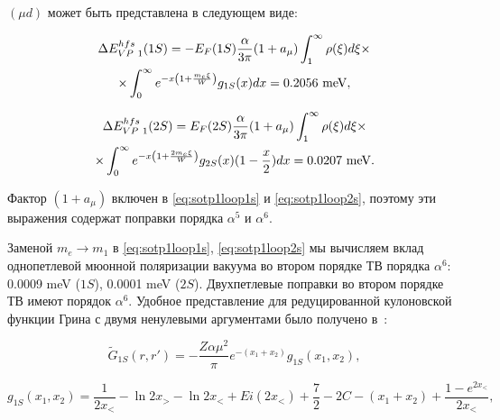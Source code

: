 $(\mu d)$ может быть представлена в следующем виде:

\begin{multline}

\label{eq:sotp1loop1s}

\Delta E^{hfs}_{VP~1}(1S)=-E_F(1S)\frac{\alpha}{3\pi}(1+a_\mu)\int_1^\infty

\rho(\xi)d\xi\times

\\

\times \int_0^\infty e^{-x\left(1+\frac{m_e\xi}{W}\right)}g_{1S}(x)dx=0.2056~\rm meV,

\end{multline}

\begin{multline}

\label{eq:sotp1loop2s}

\Delta E^{hfs}_{VP~1}(2S)=E_F(2S)\frac{\alpha}{3\pi}(1+a_\mu)\int_1^\infty

\rho(\xi)d\xi\times

\\

\times \int_0^\infty e^{-x\left(1+\frac{2m_e\xi}{W}\right)}g_{2S}(x)(1-\frac{x}{2})dx

=0.0207~\rm meV.

\end{multline}

Фактор $(1+a_\mu)$ включен в \eqref{eq:sotp1loop1s} и \eqref{eq:sotp1loop2s}, поэтому эти выражения содержат поправки порядка $\alpha^5$ и $\alpha^6$.

Заменой $m_e\to m_1$ в \eqref{eq:sotp1loop1s}, \eqref{eq:sotp1loop2s} мы вычисляем вклад однопетлевой мюонной поляризации вакуума во втором порядке ТВ порядка $\alpha^6$: 0.0009 meV ($1S$), 0.0001 meV ($2S$). Двухпетлевые поправки во втором порядке ТВ имеют порядок $\alpha^6$. Удобное представление для редуцированной кулоновской функции Грина с двумя ненулевыми аргументами было получено в~\cite{hameka}:

\begin{equation}

\label{eq:green1s}

\tilde G_{1S}(r,r')=-\frac{Z\alpha\mu^2}{\pi}e^{-(x_1+x_2)}g_{1S}(x_1,x_2),

\end{equation}

\begin{displaymath}

g_{1S}(x_1,x_2)=\frac{1}{2x_{<}}-\ln 2x_{>}-\ln 2x_{<}+Ei (2x_{<})+\frac{7}{2}-2C-(x_1+x_2)+

\frac{1-e^{2x_{<}}}{2x_{<}},

\end{displaymath}

